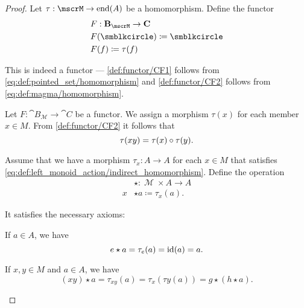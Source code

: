 \begin{proof}
   Let \( \tau: \mscrM \to \End(A) \) be a homomorphism. Define the functor
  \begin{equation*}
    \begin{aligned}
      &F: \cat{B}_\mscrM \to \cat{C} \\
      &F(\anon) \coloneqq \anon \\
      &F(f) \coloneqq \tau(f)
    \end{aligned}
  \end{equation*}

  This is indeed a functor --- \ref{def:functor/CF1} follows from \eqref{eq:def:pointed_set/homomorphism} and \ref{def:functor/CF2} follows from \eqref{eq:def:magma/homomorphism}.

   Let \( F: \cat{B}_\mscrM \to \cat{C} \) be a functor. We assign a morphism \( \tau(x) \) for each member \( x \in M \). From \ref{def:functor/CF2} it follows that
  \begin{equation*}
    \tau(xy) = \tau(x) \bincirc \tau(y).
  \end{equation*}

   Assume that we have a morphism \( \tau_x: A \to A \) for each \( x \in M \) that satisfies \eqref{eq:def:left_monoid_action/indirect_homomorphism}. Define the operation
  \begin{align*}
    {}&\star{}: \mscrM \times A \to A \\
    x &\star a \coloneqq \tau_x(a).
  \end{align*}

  It satisfies the necessary axioms:
  \begin{refenum}
     If \( a \in A \), we have
    \begin{equation*}
      e \star a
      =
      \tau_e(a)
      =
      \operatorname{id}(a)
      =
      a.
    \end{equation*}

     If \( x, y \in M \) and \( a \in A \), we have
    \begin{equation*}
      (x y) \star a
      =
      \tau_{x y}(a)
      =
      \tau_{x}(\tau{y}(a))
      =
      g \star (h \star a).
    \end{equation*}
  \end{refenum}


\end{proof}
